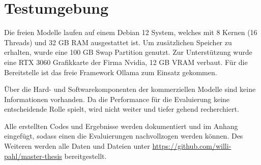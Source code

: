 \section{Testumgebung}
Die freien Modelle laufen auf einem Debian 12 System, welches mit 8 Kernen (16 Threads) und 32 GB RAM ausgestattet ist. Um zusätzlichen Speicher zu erhalten, wurde eine 100 GB Swap Partition genutzt. Zur Unterstützung wurde eine RTX 3060 Grafikkarte der Firma Nvidia, 12 GB VRAM verbaut. Für die Bereitstelle ist das freie Framework Ollama zum Einsatz gekommen.\vspace{0.2cm}

Über die Hard- und Softwarekomponenten der kommerziellen Modelle sind keine Informationen vorhanden. Da die Performance für die Evaluierung keine entscheidende Rolle spielt, wird nicht weiter und tiefer gehend recherchiert. \vspace{0.2cm}

Alle erstellten Codes und Ergebnisse werden dokumentiert und im Anhang eingefügt, sodass einen die Evaluierungen nachvollzogen werden können. Des Weiteren werden alle Daten und Dateien unter \href{https://github.com/willi-pahl/master-thesis}{https://github.com/willi-pahl/master-thesis} bereitgestellt.\vspace{0.2cm}


